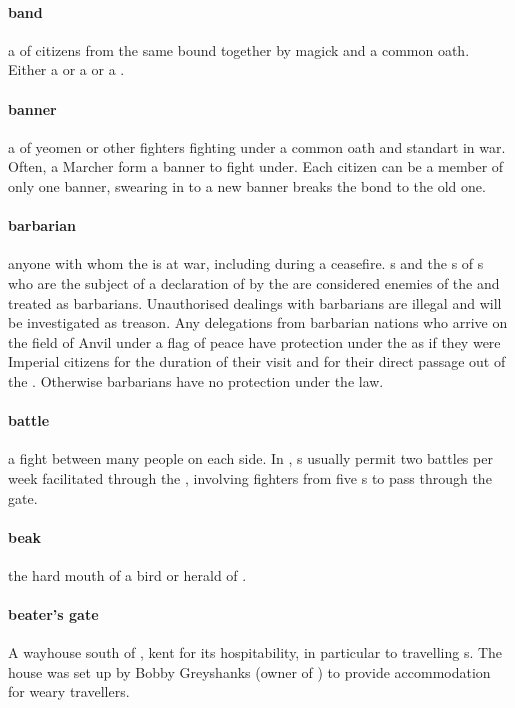 \paragraph{band} a  of citizens from the same  bound together by magick and a common oath. Either a  or a  or a .
\paragraph{banner} a  of yeomen or other fighters fighting under a common oath and standart in war. Often, a Marcher  form a banner to fight under. Each citizen can be a member of only one banner, swearing in to a new banner breaks the bond to the old one. 
\paragraph{barbarian} anyone with whom the  is at war, including during a ceasefire. s and the s of s who are the subject of a declaration of  by the  are considered enemies of the  and treated as barbarians. Unauthorised dealings with barbarians are illegal and will be investigated as treason. Any delegations from barbarian nations who arrive on the field of Anvil under a flag of peace have protection under the  as if they were Imperial citizens for the duration of their visit and for their direct passage out of the . Otherwise barbarians have no protection under the law.
\paragraph{battle} a fight between many people on each side. In , s usually permit two battles per week facilitated through the , involving fighters from five s to pass through the gate.
\paragraph{beak} the hard mouth of a bird or herald of .
\paragraph{beater's gate} A wayhouse south of , kent for its hospitability, in particular to travelling s. The house was set up by Bobby Greyshanks (owner of ) to provide accommodation for weary travellers.
